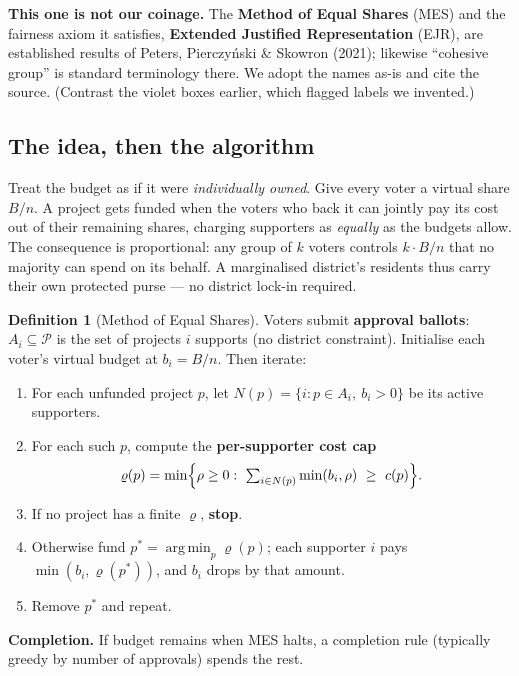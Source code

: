 \documentclass[11pt,letterpaper]{article}
\theoremstyle{definition}
\newtheorem{definition}{Definition}[section]
\theoremstyle{plain}
\theoremstyle{remark}
\newcommand{\Pset}{\mathcal{P}}
\newcommand{\budget}{B}
\newcommand{\cost}{c}
\newcommand{\mesrho}{\varrho}      %
\DeclareMathOperator*{\argmin}{arg\,min}
\providecommand{\citet}[1]{Peters, Pierczy\'nski \& Skowron (2021)}
\begin{document}
\begin{aside}\small
\textbf{This one is not our coinage.} The \textbf{Method of Equal Shares} (MES) and the fairness
axiom it satisfies, \textbf{Extended Justified Representation} (EJR), are established results of
\citet{peters2021}; likewise ``cohesive group'' is standard terminology there. We adopt the names
as-is and cite the source. (Contrast the violet boxes earlier, which flagged labels we invented.)
\end{aside}

\subsection{The idea, then the algorithm}

\begin{keyidea}
Treat the budget as if it were \emph{individually owned}. Give every voter a virtual share
$\budget/n$. A project gets funded when the voters who back it can jointly pay its cost out of
their remaining shares, charging supporters as \emph{equally} as the budgets allow. The
consequence is proportional: any group of $k$ voters controls $k\cdot\budget/n$ that no majority
can spend on its behalf. A marginalised district's residents thus carry their own protected
purse --- no district lock-in required.
\end{keyidea}

\begin{definition}[Method of Equal Shares]
\label{def:mes}
Voters submit \textbf{approval ballots}: $A_i\subseteq\Pset$ is the set of projects $i$ supports
(no district constraint). Initialise each voter's virtual budget at $b_i=\budget/n$. Then iterate:
\begin{enumerate}[label=\textbf{\arabic*.},nosep]
  \item For each unfunded project $p$, let $N(p)=\{i:p\in A_i,\ b_i>0\}$ be its active supporters.
  \item For each such $p$, compute the \textbf{per-supporter cost cap}
        \[
          \mesrho(p)=\min\Bigl\{\rho\ge0:\ \textstyle\sum_{i\in N(p)}\min(b_i,\rho)\ \ge\ \cost(p)\Bigr\}.
        \]
  \item If no project has a finite $\mesrho$, \textbf{stop}.
  \item Otherwise fund $p^*=\argmin_p \mesrho(p)$; each supporter $i$ pays $\min(b_i,\mesrho(p^*))$,
        and $b_i$ drops by that amount.
  \item Remove $p^*$ and repeat.
\end{enumerate}
\textbf{Completion.} If budget remains when MES halts, a completion rule (typically greedy by
number of approvals) spends the rest.
\end{definition}
\end{document}
